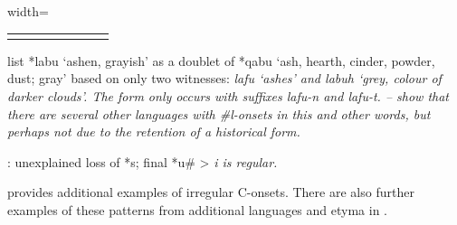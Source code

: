 \begin{table}[p]
\begin{adjustbox}{width=\textwidth}
\begin{threeparttable}
\begin{tabular}{lll@{ }lllll}
		\lspbottomrule
	\end{tabular}
		\begin{tablenotes}\tnsize
			\item[†]	{\citet{BlustTrussel2020} list *labu ‘ashen,
								grayish’ as a doublet of *qabu ‘ash,
								hearth, cinder, powder, dust; gray’ based on only two witnesses:
								 \it{lafu} ‘ashes’ and  \it{labuh} ‘grey,
								colour of darker clouds’.
								The  form only occurs with suffixes \it{lafu-n} and \it{lafu-t}.
								-- show that
								there are several other languages with {\#}l-onsets in this
								and other words, but perhaps not due to the retention of a historical form.}
			\item[‡]	{: unexplained loss of *s; final *u{\#} > \it{i} is regular.}
		\end{tablenotes}
	\end{threeparttable}
\end{adjustbox}
\end{table}

 provides additional examples of irregular C-onsets.
There are also further examples of these patterns from additional
languages and etyma in \citet[120--128]{Collins1982d,Collins1983}.

